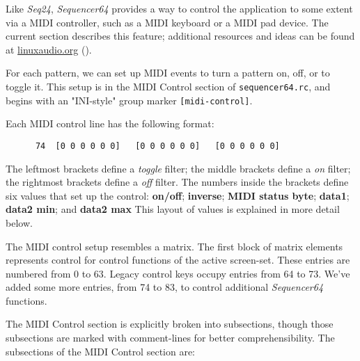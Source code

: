    Like \textsl{Seq24}, \textsl{Sequencer64} provides a way to control the
   application to some extent via a MIDI controller, such as a MIDI keyboard or
   a MIDI pad device.  The current section describes this feature;
   additional resources and ideas can be found at \url{linuxaudio.org}
   (\cite{midicontrol}).

   For each pattern, we can set up MIDI events to turn a 
   pattern on, off, or to toggle it.  This setup is in the 
   MIDI Control section of \texttt{sequencer64.rc}, and begins with an
   "INI-style" group marker \texttt{[midi-control]}.

   Each MIDI control line has the following format:

   \begin{verbatim}
      74  [0 0 0 0 0 0]   [0 0 0 0 0 0]   [0 0 0 0 0 0]
   \end{verbatim}

   The leftmost brackets define a \textsl{toggle} filter;
   the middle brackets define a \textsl{on} filter;
   the rightmost brackets define a \textsl{off} filter.
   The numbers inside the brackets define six values that set up the control:
   \textbf{on/off}; \textbf{inverse}; \textbf{MIDI status byte};
   \textbf{data1}; \textbf{data2 min}; and \textbf{data2 max}
   This layout of values is explained in more detail below.

   The MIDI control setup resembles a matrix.
   The first block of matrix elements represents control for control
   functions of the active screen-set.
   These entries are numbered from 0 to 63.
   Legacy control keys occupy entries from 64 to 73.
   We've added some more entries, from 74 to 83, to control additional
   \textsl{Sequencer64} functions.
   
   The MIDI Control section is explicitly broken into subsections, though those
   subsections are marked with comment-lines for better comprehensibility.  The
   subsections of the MIDI Control section are:

